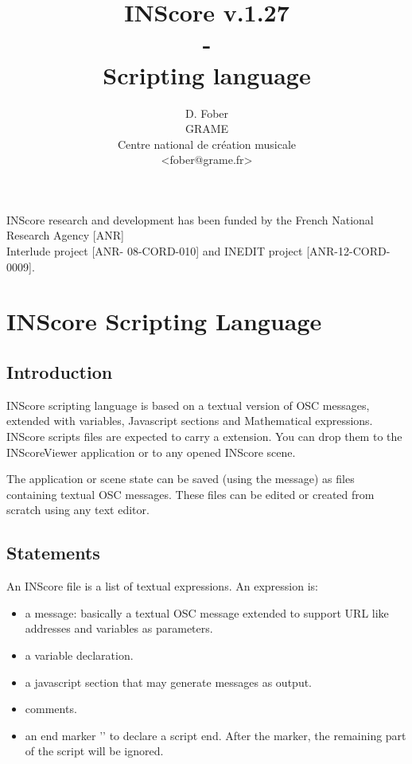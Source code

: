 \documentclass[a4paper,twoside]{report}
\newcommand{\toplevel}[1]	{\chapter{#1}}
\newcommand{\sublevel}[1]	{\section{#1}}
\newcommand{\inscoreend}  {\_\_END\_\_}
\begin{document}
\title{INScore v.1.27 \\ - \\ Scripting language}

\author{D. Fober\\ GRAME\\ Centre national de création musicale\\
{\small <fober@grame.fr>} \\
}

\maketitle

 

{\small INScore research and development has been funded by the French National Research Agency [ANR]\\ Interlude project [ANR- 08-CORD-010] and INEDIT project [ANR-12-CORD-0009].}
  

\pagestyle{empty}
\cleardoublepage
\tableofcontents

\thispagestyle{empty}
\pagestyle{plain}

\newpage

\setcounter{page}{1}


\toplevel{INScore Scripting Language}
\label{scripting}

\sublevel{Introduction}
\label{introduction}

INScore scripting language is based on a textual version of OSC messages, extended with variables, Javascript sections and Mathematical expressions.
INScore scripts files are expected to carry a  extension. You can drop them to the INScoreViewer application or to any opened INScore scene.

The application or scene state can be saved (using the  message) as files containing textual OSC messages. These files can be edited or created from scratch using any text editor. 

\sublevel{Statements}
\label{scriptstatement}
An INScore file is a list of textual expressions. An expression is:
\begin{itemize}
\item a message: basically a textual OSC message extended to support URL like addresses and variables as parameters.
\item a variable declaration.
\item a javascript section that may generate messages as output.
\item comments.
\item an end marker '\OSC{\inscoreend}' to declare a script end. After the marker, the remaining part of the script will be ignored.
\end{itemize}
\end{document}
